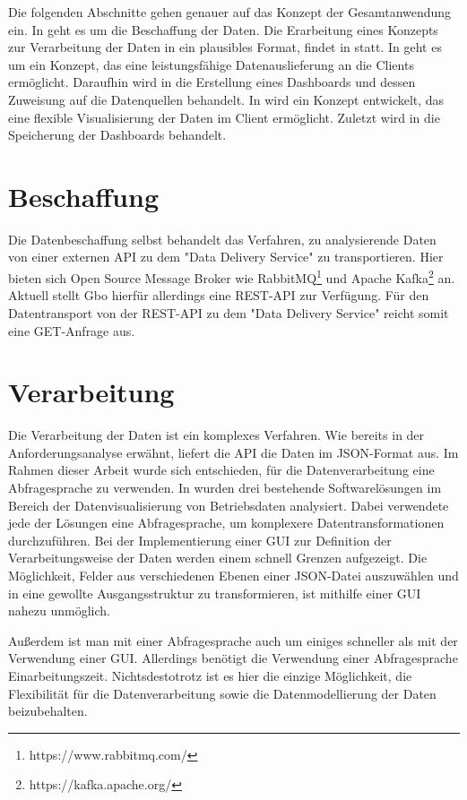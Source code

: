 Die folgenden Abschnitte gehen genauer auf das Konzept der Gesamtanwendung ein.
In  geht es um die Beschaffung der Daten. Die Erarbeitung eines Konzepts zur
Verarbeitung der Daten in ein plausibles Format, findet in  statt.
In  geht es um ein Konzept, das
eine leistungsfähige Datenauslieferung an die Clients ermöglicht.
Daraufhin wird in  die Erstellung eines Dashboards und dessen Zuweisung auf die
Datenquellen behandelt. In  wird ein Konzept entwickelt,
das eine flexible Visualisierung der Daten im Client ermöglicht.
Zuletzt wird in  die Speicherung der Dashboards behandelt.

\section{Beschaffung}
\label{sec:beschaffung}
Die Datenbeschaffung selbst behandelt das Verfahren, zu analysierende Daten
von einer externen API zu dem "Data Delivery Service" zu transportieren.
Hier bieten sich Open Source Message Broker wie RabbitMQ\footnote{https://www.rabbitmq.com/} und Apache Kafka\footnote{https://kafka.apache.org/} an.
Aktuell stellt Gbo hierfür allerdings eine REST-API zur Verfügung.
Für den Datentransport von der REST-API zu dem "Data Delivery Service" reicht somit
eine GET-Anfrage aus.

\section{Verarbeitung}
\label{sec:verarbeitung}
Die Verarbeitung der Daten ist ein komplexes Verfahren. Wie bereits in der
Anforderungsanalyse erwähnt, liefert die API die Daten im
JSON-Format aus. Im Rahmen dieser Arbeit wurde sich entschieden,
für die Datenverarbeitung eine Abfragesprache zu verwenden. In 
wurden drei bestehende Softwarelösungen im Bereich der Datenvisualisierung von
Betriebsdaten analysiert. Dabei verwendete jede der Lösungen eine Abfragesprache,
um komplexere Datentransformationen durchzuführen. Bei der Implementierung einer
GUI zur Definition der Verarbeitungsweise der Daten werden einem schnell Grenzen aufgezeigt.
Die Möglichkeit, Felder aus verschiedenen Ebenen einer JSON-Datei auszuwählen
und in eine gewollte Ausgangsstruktur zu transformieren, ist mithilfe einer GUI nahezu
unmöglich.

Außerdem ist man mit einer Abfragesprache auch um einiges schneller als mit
der Verwendung einer GUI. Allerdings benötigt die Verwendung einer Abfragesprache
Einarbeitungszeit. \mbox{Nichtsdestotrotz} ist es hier die einzige Möglichkeit,
die Flexibilität für die Datenverarbeitung sowie die Datenmodellierung der Daten
beizubehalten.

